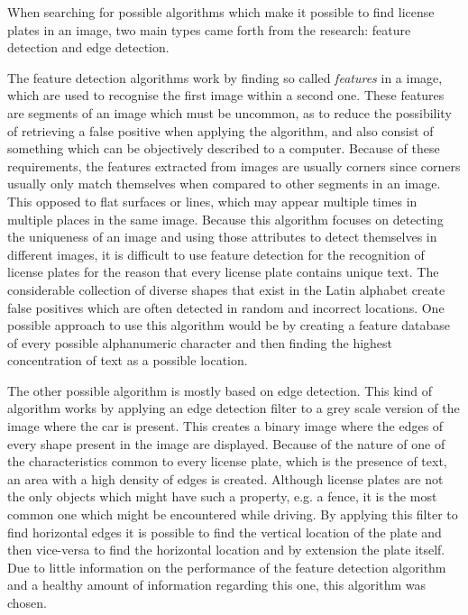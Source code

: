 
When searching for possible algorithms which make it possible to find license plates in an image, two main types came forth from the research: feature detection and edge detection. 

The feature detection algorithms work by finding so called \emph{features} in a image, which are used to recognise the first image within a second one. These features are segments of an image which must be uncommon, as to reduce the possibility of retrieving a false positive when applying the algorithm, and also consist of something which can be objectively described to a computer. Because of these requirements, the features extracted from images are usually corners since corners usually only match themselves when compared to other segments in an image. This opposed to flat surfaces or lines, which may appear multiple times in multiple places in the same image. Because this algorithm focuses on detecting the uniqueness of an image and using those attributes to detect themselves in different images, it is difficult to use feature detection for the recognition of license plates for the reason that every license plate contains unique text. The considerable collection of diverse shapes that exist in the Latin alphabet create false positives which are often detected in random and incorrect locations. One possible approach to use this algorithm would be by creating a feature database of every possible alphanumeric character and then finding the highest concentration of text as a possible location. 

The other possible algorithm is mostly based on edge detection. This kind of algorithm works by applying an edge detection filter to a grey scale version of the image where the car is present. This creates a binary image where the edges of every shape present in the image are displayed. Because of the nature of one of the characteristics common to every license plate, which is the presence of text, an area with a high density of edges is created. Although license plates are not the only objects which might have such a property, e.g. a fence, it is the most common one which might be encountered while driving. By applying this filter to find horizontal edges it is possible to find the vertical location of the plate and then vice-versa to find the horizontal location and by extension the plate itself. Due to little information on the performance of the feature detection algorithm and a healthy amount of information regarding this one, this algorithm was chosen.

